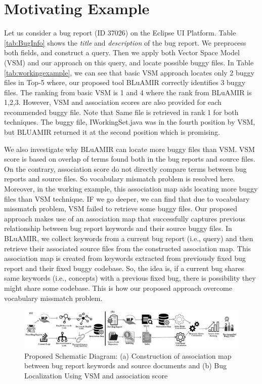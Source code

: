 \documentclass[conference]{IEEEtran}
\begin{document}
\section{Motivating Example}\label{sec:motivatingexample}
Let us consider a bug report (ID 37026) on the Eclipse UI Platform. Table \ref{tab:BugInfo} shows the \textit{title} and \textit{description} of the bug report. We preprocess both fields, and construct a query. Then we apply both Vector Space Model (VSM) and our approach on this query, and locate possible buggy files. 
In Table \ref{tab:workingexample}, we can see that basic VSM approach locates only 2 buggy files in Top-5 where, our proposed tool BLuAMIR correctly identifies 3 buggy files. The ranking from basic VSM is 1 and 4 where the rank from BLuAMIR is 1,2,3. However, VSM and association scores are also provided for each recommended buggy file. 
Note that Same file is retrieved in rank 1 for both techniques. 
The buggy file,  
IWorkingSet.java was in the fourth position by VSM, but BLUAMIR returned it at the second position which is promising.

We also investigate why BLuAMIR can locate more buggy files than VSM.  
VSM score is based on overlap of terms found both in the bug reports and source files. On the contrary, association score do not directly compare terms between bug reports and source files. So vocabulary mismatch problem is resolved here. Moreover, in the working example, this association map aids locating more buggy files than VSM technique. IF we go deeper, we can find that due to vocabulary missmatch problem, VSM failed to retrieve some buggy files. Our proposed approach makes use of an association map that successfully captures previous relationship between bug report keywords and their source buggy files. 
In BLuAMIR, we collect keywords from a current bug report (i.e., query) and then retrieve their associated source files from the constructed association map. 
This association map is created from keywords extracted from previously fixed bug report and their fixed buggy codebase. So, the idea is, if a current bug shares same keywords (i.e., concepts) with a previous fixed bug, there is possibility they might share some codebase. This is how our proposed approach overcome vocabulary missmatch problem.

\begin{figure}
	\centering
	\includegraphics[scale=0.60]{SD6-Gray}
	\caption{Proposed Schematic Diagram: (a) Construction of association map between bug report keywords and source documents and (b) Bug Localization Using VSM and association score}
	\label{fig:systemDiagram}
\end{figure}
\end{document}
